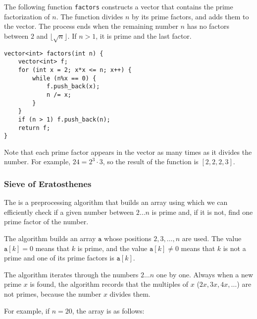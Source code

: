 \noindent
The following function \texttt{factors}
constructs a vector that contains the prime
factorization of $n$.
The function divides $n$ by its prime factors,
and adds them to the vector.
The process ends when the remaining number $n$
has no factors between $2$ and $\lfloor \sqrt n \rfloor$.
If $n>1$, it is prime and the last factor.

\begin{lstlisting}
vector<int> factors(int n) {
    vector<int> f;
    for (int x = 2; x*x <= n; x++) {
        while (n%x == 0) {
            f.push_back(x);
            n /= x;
        }
    }
    if (n > 1) f.push_back(n);
    return f;
}
\end{lstlisting}

Note that each prime factor appears in the vector
as many times as it divides the number.
For example, $24=2^3 \cdot 3$,
so the result of the function is $[2,2,2,3]$.

\subsubsection{Sieve of Eratosthenes}


The 
is a preprocessing
algorithm that builds an array using which we
can efficiently check if a given number between $2 \ldots n$
is prime and, if it is not, find one prime factor of the number.

The algorithm builds an array $\texttt{a}$
whose positions $2,3,\ldots,n$ are used.
The value $\texttt{a}[k]=0$ means
that $k$ is prime,
and the value $\texttt{a}[k] \neq 0$
means that $k$ is not a prime and one
of its prime factors is $\texttt{a}[k]$.

The algorithm iterates through the numbers
$2 \ldots n$ one by one.
Always when a new prime $x$ is found,
the algorithm records that the multiples
of $x$ ($2x,3x,4x,\ldots$) are not primes,
because the number $x$ divides them.

For example, if $n=20$, the array is as follows:

